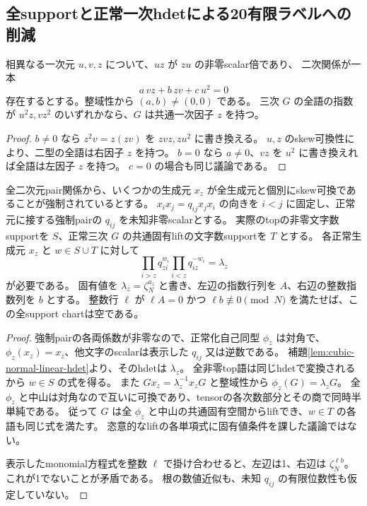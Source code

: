 \subsection{全supportと正常一次hdetによる20有限ラベルへの削減}
\label{subsec:cubic-four-simple-support-sieve}
\begin{lemma}[連結二三次型の共通因子]
\label{lem:cubic-linked-binary-factor}
相異なる一次元 $u,v,z$ について、$uz$ が $zu$ の非零scalar倍であり、
二次関係が一本
\[
 a\,vz+b\,zv+c\,u^2=0
\]
存在するとする。整域性から $(a,b)\ne(0,0)$ である。
三次 $G$ の全語の指数が $u^2z,vz^2$ のいずれかなら、$G$ は共通一次因子 $z$ を持つ。
\end{lemma}
\begin{proof}
$b\ne0$ なら $z^2v=z(zv)$ を $zvz,zu^2$ に書き換える。
$u,z$ のskew可換性により、二型の全語は右因子 $z$ を持つ。
$b=0$ なら $a\ne0$、$vz$ を $u^2$ に書き換えれば全語は左因子 $z$ を持つ。
$c=0$ の場合も同じ議論である。
\end{proof}

\begin{proposition}[正常化scalarの整数左核障害]
\label{prop:cubic-support-normalizer-leftkernel}
全二次元pair関係から、いくつかの生成元 $x_z$ が全生成元と個別にskew可換であることが強制されているとする。
$x_ix_j=q_{ij}x_jx_i$ の向きを $i<j$ に固定し、正常元に接する強制pairの $q_{ij}$ を未知非零scalarとする。
実際のtopの非零文字数supportを $S$、正常三次 $G$ の共通固有liftの文字数supportを $T$ とする。
各正常生成元 $x_z$ と $w\in S\cup T$ に対して
\[
 \prod_{i>z}q_{zi}^{w_i}\prod_{i<z}q_{iz}^{-w_i}=\lambda_z
\]
が必要である。
固有値を $\lambda_z=\zeta_N^{a_z}$ と書き、左辺の指数行列を $A$、右辺の整数指数列を $b$ とする。
整数行 $\ell$ が $\ell A=0$ かつ $\ell b\not\equiv0\pmod N$ を満たせば、この全support chartは空である。
\end{proposition}
\begin{proof}
強制pairの各両係数が非零なので、正常化自己同型 $\phi_z$ は対角で、
$\phi_z(x_z)=x_z$、他文字のscalarは表示した $q_{ij}$ 又は逆数である。
補題\ref{lem:cubic-normal-linear-hdet}より、そのhdetは $\lambda_z$。
全非零top語は同じhdetで変換されるから $w\in S$ の式を得る。
また $Gx_z=\lambda_z^{-1}x_zG$ と整域性から $\phi_z(G)=\lambda_zG$。
全 $\phi_z$ と中山は対角なので互いに可換であり、tensorの各次数部分とその商で同時半単純である。
従って $G$ は全 $\phi_z$ と中山の共通固有空間からliftでき、$w\in T$ の各語も同じ式を満たす。
恣意的なliftの各単項式に固有値条件を課した議論ではない。

表示したmonomial方程式を整数 $\ell$ で掛け合わせると、左辺は1、右辺は $\zeta_N^{\ell b}$。
これが1でないことが矛盾である。
根の数値近似も、未知 $q_{ij}$ の有限位数性も仮定していない。
\end{proof}

